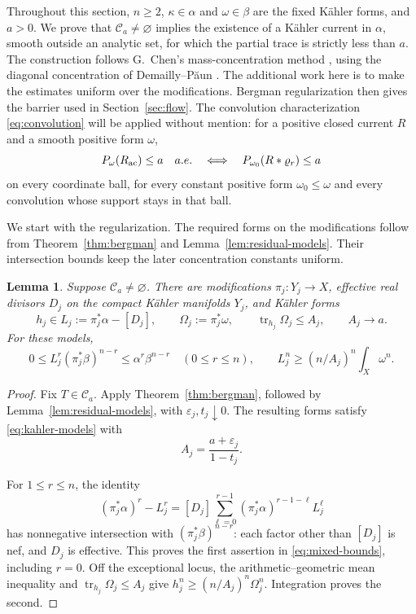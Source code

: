 \documentclass[reqno]{amsart}
\numberwithin{equation}{section}
\newtheorem{lemma}[theorem]{Lemma}
\theoremstyle{definition}
\DeclareMathOperator{\tr}{tr}
\begin{document}
Throughout this section, $n\ge2$, $\kappa\in\alpha$ and
$\omega\in\beta$ are the fixed K\"ahler forms, and $a>0$.
We prove that $\mathcal C_a\ne\varnothing$ implies the existence of a
K\"ahler current in $\alpha$, smooth outside an analytic set, for which
the partial trace is strictly less than $a$. The construction follows
G.~Chen's mass-concentration method \cite[Section~3]{C21},
using the diagonal concentration of Demailly--P\u{a}un \cite{DP04}.
The additional work here is to make the estimates uniform over the modifications.
Bergman regularization then gives the barrier used in
Section~\ref{sec:flow}. 
The convolution characterization
\eqref{eq:convolution} will be applied without mention: for a positive closed current
$R$ and a smooth positive form $\omega$,
\[
 P_\omega(R_{\rm ac})\le a\quad 
 a.e. \quad\Longleftrightarrow\quad
 P_{\omega_0}(R*\varrho_r)\le a
\]
on every coordinate ball, for every constant positive form $\omega_0\le \omega$
and every convolution whose support stays in that ball. 

We start with the regularization. The required forms on the modifications follow from
Theorem~\ref{thm:bergman} and
Lemma~\ref{lem:residual-models}.
Their intersection bounds keep the later concentration
constants uniform.
\begin{lemma}\label{lem:kahler-models}
Suppose $\mathcal C_a\ne\varnothing$. There are modifications
$\pi_j:Y_j\to X$, effective real divisors $D_j$ on the  compact
K\"ahler manifolds $Y_j$, and K\"ahler forms
\begin{equation}\label{eq:kahler-models}
 h_j\in L_j:=\pi_j^*\alpha-[D_j],\qquad
 \Omega_j:=\pi_j^*\omega,\qquad
 \tr_{h_j}\Omega_j\le A_j,\qquad A_j\longrightarrow a.
\end{equation}
For these models,
\begin{equation}\label{eq:mixed-bounds}
 0\le L_j^r(\pi_j^*\beta)^{n-r}
       \le\alpha^r\beta^{n-r}\quad(0\le r\le n),
 \qquad
 L_j^n\ge(n/A_j)^n\int_X\omega^n.
\end{equation}
\end{lemma}

\begin{proof}
Fix $T\in\mathcal C_a$. Apply
Theorem~\ref{thm:bergman}, followed by
Lemma~\ref{lem:residual-models}, with
$\varepsilon_j,t_j\downarrow0$. The resulting forms satisfy
\eqref{eq:kahler-models} with
\[
 A_j=\frac{a+\varepsilon_j}{1-t_j}.
\]

For $1\le r\le n$, the identity
\[
 (\pi_j^*\alpha)^r-L_j^r
 =[D_j]\sum_{\ell=0}^{r-1}
          (\pi_j^*\alpha)^{r-1-\ell}L_j^\ell
\]
has nonnegative intersection with $(\pi_j^*\beta)^{n-r}$: each
factor other than $[D_j]$ is nef, and $D_j$ is effective.
This proves the first assertion in
\eqref{eq:mixed-bounds}, including $r=0$.
Off the exceptional locus, the arithmetic--geometric mean inequality
and $\tr_{h_j}\Omega_j\le A_j$ give
$h_j^n\ge(n/A_j)^n\Omega_j^n$. Integration proves the second.
\end{proof}
\end{document}
